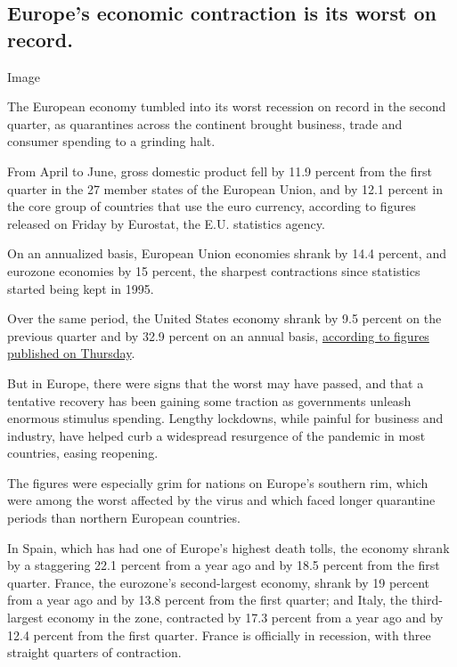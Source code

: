 \hypertarget{europes-economic-contraction-is-its-worst-on-record}{%
\subsection{Europe's economic contraction is its worst on
record.}\label{europes-economic-contraction-is-its-worst-on-record}}

Image

The European economy tumbled into its worst recession on record in the
second quarter, as quarantines across the continent brought business,
trade and consumer spending to a grinding halt.

From April to June, gross domestic product fell by 11.9 percent from the
first quarter in the 27 member states of the European Union, and by 12.1
percent in the core group of countries that use the euro currency,
according to figures released on Friday by Eurostat, the E.U. statistics
agency.

On an annualized basis, European Union economies shrank by 14.4 percent,
and eurozone economies by 15 percent, the sharpest contractions since
statistics started being kept in 1995.

Over the same period, the United States economy shrank by 9.5 percent on
the previous quarter and by 32.9 percent on an annual basis,
\href{https://www.nytimes3xbfgragh.onion/2020/07/30/business/economy/q2-gdp-coronavirus-economy.html}{according
to figures published on Thursday}.

But in Europe, there were signs that the worst may have passed, and that
a tentative recovery has been gaining some traction as governments
unleash enormous stimulus spending. Lengthy lockdowns, while painful for
business and industry, have helped curb a widespread resurgence of the
pandemic in most countries, easing reopening.

The figures were especially grim for nations on Europe's southern rim,
which were among the worst affected by the virus and which faced longer
quarantine periods than northern European countries.

In Spain, which has had one of Europe's highest death tolls, the economy
shrank by a staggering 22.1 percent from a year ago and by 18.5 percent
from the first quarter. France, the eurozone's second-largest economy,
shrank by 19 percent from a year ago and by 13.8 percent from the first
quarter; and Italy, the third-largest economy in the zone, contracted by
17.3 percent from a year ago and by 12.4 percent from the first quarter.
France is officially in recession, with three straight quarters of
contraction.


